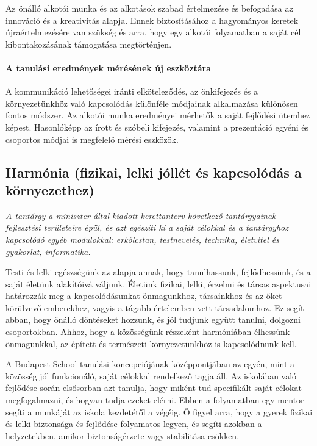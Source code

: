 Az önálló alkotói munka és az alkotások szabad értelmezése és befogadása az
innováció és a kreativitás alapja. Ennek biztosításához a hagyományos keretek
újraértelmezésére van szükség és arra, hogy egy alkotói folyamatban a saját cél
kibontakozásának támogatása megtörténjen.

\paragraph{A tanulási eredmények mérésének új eszköztára}

A kommunikáció lehetőségei iránti elköteleződés, az önkifejezés és a
környezetünkhöz való kapcsolódás különféle módjainak alkalmazása különösen
fontos módszer. Az alkotói munka eredményei mérhetők a saját fejlődési ütemhez
képest. Hasonlóképp az írott és szóbeli kifejezés, valamint a prezentáció
egyéni és csoportos módjai is megfelelő mérési eszközök.

\subsection[Harmónia]{Harmónia (fizikai, lelki jóllét és kapcsolódás a
  környezethez)}
\emph{A tantárgy a miniszter által kiadott kerettanterv következő tantárgyainak
  fejlesztési területeire épül, és azt egészíti ki a saját célokkal és a
  tantárgyhoz kapcsolódó egyéb modulokkal: erkölcstan, testnevelés, technika,
  életvitel és gyakorlat, informatika.}

Testi és lelki egészségünk az alapja annak, hogy tanulhassunk, fejlődhessünk,
és a saját életünk alakítóivá váljunk. Életünk fizikai, lelki, érzelmi és
társas aspektusai határozzák meg a kapcsolódásunkat önmagunkhoz, társainkhoz és
az őket körülvevő emberekhez, vagyis a tágabb értelemben vett társadalomhoz. Ez
segít abban, hogy önálló döntéseket hozzunk, és jól tudjunk együtt tanulni,
dolgozni csoportokban. Ahhoz, hogy a közösségünk részeként harmóniában
élhessünk önmagunkkal, az épített és természeti környezetünkhöz is
kapcsolódnunk kell.

A Budapest School tanulási koncepciójának középpontjában az egyén, mint a
közösség jól funkcionáló, saját célokkal rendelkező tagja áll. Az iskolában
való fejlődése során elsősorban azt tanulja, hogy miként tud specifikált saját
célokat megfogalmazni, és hogyan tudja ezeket elérni. Ebben a folyamatban egy
mentor segíti a munkáját az iskola kezdetétől a végéig. Ő figyel arra, hogy a
gyerek fizikai és lelki biztonsága és fejlődése folyamatos legyen, és segíti
azokban a helyzetekben, amikor biztonságérzete vagy stabilitása csökken.


